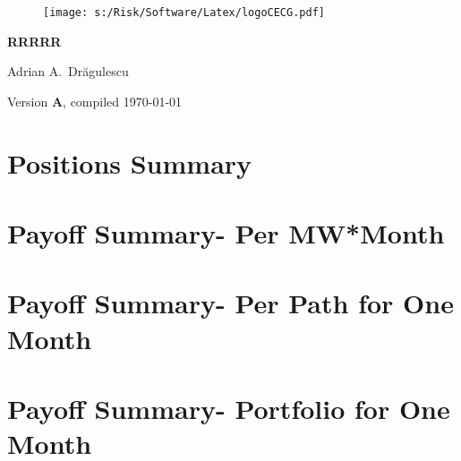 \documentclass[letterpaper,10pt]{article}
\begin{document}
\begin{figure}
\texttt{[image: s:/Risk/Software/Latex/logoCECG.pdf]}
\hfill
{}
\end{figure}
 
\vspace*{0.5in}
\begin{center}
\LARGE\bf{RRRRR}
\end{center}
\begin{center}
   Adrian A.\ Dr\u{a}gulescu
\end{center}
\begin{center}
  \small{Version {\bf A}, compiled \today}
\end{center}
\vspace*{1in}

\tableofcontents
\section{Positions Summary}



\section{Payoff Summary- Per MW*Month}
\clearpage


\section{Payoff Summary- Per Path for One Month}
\clearpage


\section{Payoff Summary- Portfolio for One Month}
\clearpage

\end{document}
